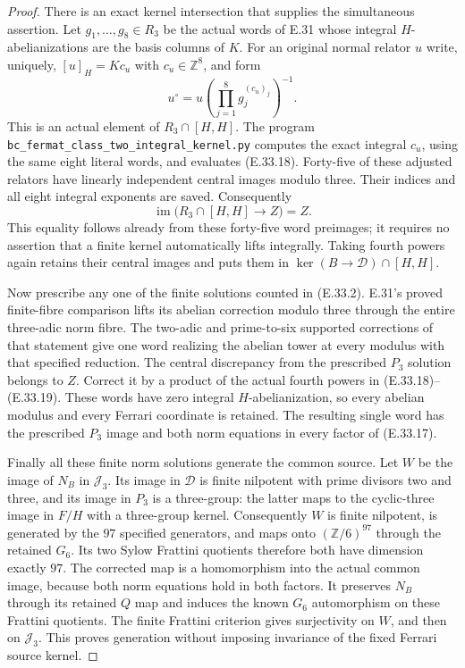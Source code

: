 \begin{proof}
There is an exact kernel intersection that supplies the
simultaneous assertion.  Let $g_1,\ldots,g_8\in R_3$
be the actual words of E.31 whose integral
$H$-abelianizations are the basis columns of $K$.
For an original normal relator $u$ write, uniquely,
$[u]_H=Kc_u$ with $c_u\in\mathbb Z^8$, and form
\[
 u^\circ=u\left(\prod_{j=1}^8g_j^{(c_u)_j}\right)^{-1}.
 \tag{E.33.18}
\]
This is an actual element of $R_3\cap[H,H]$.
The program
\texttt{bc\_fermat\_class\_two\_integral\_kernel.py}
computes the exact integral $c_u$, using the same
eight literal words, and evaluates \textup{(E.33.18)}.
Forty-five of these adjusted relators have linearly
independent central images modulo three.  Their
indices and all eight integral exponents are saved.
Consequently
\[
 \operatorname{im}\bigl(R_3\cap[H,H]\longrightarrow Z\bigr)
                              =Z.
 \tag{E.33.19}
\]
This equality follows already from these forty-five
word preimages; it requires no assertion that a
finite kernel automatically lifts integrally.
Taking fourth powers again retains their central
images and puts them in
$\ker(B\to\mathscr D)\cap[H,H]$.

Now prescribe any one of the finite solutions counted
in \textup{(E.33.2)}.  E.31's proved finite-fibre
comparison lifts its abelian correction modulo three
through the entire three-adic norm fibre.  The two-adic
and prime-to-six supported corrections of that statement
give one word realizing the abelian tower at every
modulus with that specified reduction.
The central discrepancy from the prescribed $P_3$
solution belongs to $Z$.  Correct it by a product
of the actual fourth powers in
\textup{(E.33.18)--(E.33.19)}.
These words have zero integral $H$-abelianization,
so every abelian modulus and every Ferrari coordinate
is retained.  The resulting single word has the
prescribed $P_3$ image and both norm equations in
every factor of \textup{(E.33.17)}.

Finally all these finite norm solutions generate
the common source.  Let $W$ be the image of $N_B$
in $\mathscr J_3$.  Its image in $\mathscr D$
is finite nilpotent with prime divisors two and
three, and its image in $P_3$ is a three-group:
the latter maps to the cyclic-three image in
$F/H$ with a three-group kernel.
Consequently $W$ is finite nilpotent, is generated
by the $97$ specified generators, and maps onto
$(\mathbb Z/6)^{97}$ through the retained $G_6$.
Its two Sylow Frattini quotients therefore both
have dimension exactly $97$.
The corrected map is a homomorphism into the
actual common image, because both norm equations
hold in both factors.  It preserves $N_B$ through
its retained $Q$ map and induces the known
$G_6$ automorphism on these Frattini quotients.
The finite Frattini criterion gives surjectivity
on $W$, and then on $\mathscr J_3$.
This proves generation without imposing invariance
of the fixed Ferrari source kernel.


\end{proof}
